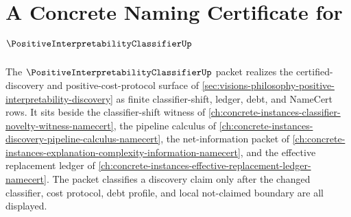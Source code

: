 \chapter{A Concrete Naming Certificate for $\PositiveInterpretabilityClassifierUp$}
\label{ch:concrete-instances-positive-interpretability-classifier-namecert}

The $\PositiveInterpretabilityClassifierUp$ packet realizes the certified-discovery and positive-cost-protocol surface of \autoref{sec:visions-philosophy-positive-interpretability-discovery} as finite classifier-shift, ledger, debt, and NameCert rows. It sits beside the classifier-shift witness of \autoref{ch:concrete-instances-classifier-novelty-witness-namecert}, the pipeline calculus of \autoref{ch:concrete-instances-discovery-pipeline-calculus-namecert}, the net-information packet of \autoref{ch:concrete-instances-explanation-complexity-information-namecert}, and the effective replacement ledger of \autoref{ch:concrete-instances-effective-replacement-ledger-namecert}. The packet classifies a discovery claim only after the changed classifier, cost protocol, debt profile, and local not-claimed boundary are all displayed.

